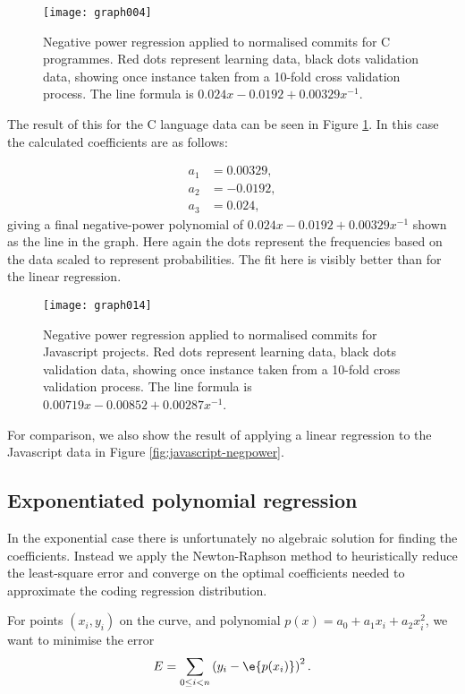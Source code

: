 \documentclass[10pt,journal,compsoc]{IEEEtran}
\begin{document}
\begin{figure}[t]
\centering
\texttt{[image: graph004]}%
\caption{\label{fig:c-negpow}Negative power regression applied to normalised commits for C programmes. Red dots represent learning data, black dots validation data, showing once instance taken from a 10-fold cross validation process. The line formula is $0.024x - 0.0192 + 0.00329x^{-1}$.}
\end{figure}

The result of this for the C language data can be seen in Figure \ref{fig:c-negpow}. In this case the calculated coefficients are as follows:

\begin{align*}
a_1 & = 0.00329, \\
a_2 & = -0.0192, \\
a_3 & = 0.024,
\end{align*}
giving a final negative-power polynomial of $0.024x - 0.0192 + 0.00329x^{-1}$ shown as the line in the graph. Here again the dots represent the frequencies based on the data scaled to represent probabilities. The fit here is visibly better than for the linear regression.

\begin{figure}[t]
\centering
\texttt{[image: graph014]}%
\caption{\label{fig:javascript-negpow}Negative power regression applied to normalised commits for Javascript projects. Red dots represent learning data, black dots validation data, showing once instance taken from a 10-fold cross validation process. The line formula is $0.00719x - 0.00852 + 0.00287x^{-1}$.}
\end{figure}

For comparison, we also show the result of applying a linear regression to the Javascript data in Figure \ref{fig:javascript-negpower}.

\subsection{Exponentiated polynomial regression}

In the exponential case there is unfortunately no algebraic solution for finding the coefficients. Instead we apply the Newton-Raphson method to heuristically reduce the least-square error and converge on the optimal coefficients needed to approximate the coding regression distribution.

For points $(x_i, y_i)$ on the curve, and polynomial $p(x) = a_0 + a_1 x_i + a_2 x_i^2$, we want to minimise the error
$$
E = \sum_{0 \le i < n} \left( y_i - \e{p(x_i)} \right)^2 .
$$
\end{document}
